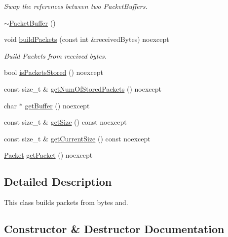 \begin{DoxyCompactItemize}
\begin{DoxyCompactList}\small\item\em Swap the references between two Packet\+Buffers. \end{DoxyCompactList}\item 
\hyperlink{classtnnf_1_1_packet_buffer_a5a962401516828ef393e69d61d5fd3d6}{$\sim$\+Packet\+Buffer} ()
\item 
void \hyperlink{classtnnf_1_1_packet_buffer_adcdb6c55ea7dacf133d6023ac22c1210}{build\+Packets} (const int \&received\+Bytes) noexcept
\begin{DoxyCompactList}\small\item\em Build Packets from received bytes. \end{DoxyCompactList}\item 
bool \hyperlink{classtnnf_1_1_packet_buffer_af43633c6f4756697a7fafe3bd85d5663}{is\+Packets\+Stored} () noexcept
\item 
const size\+\_\+t \& \hyperlink{classtnnf_1_1_packet_buffer_abdbab0715e0c034cd64217ca89b3038b}{get\+Num\+Of\+Stored\+Packets} () noexcept
\item 
char $\ast$ \hyperlink{classtnnf_1_1_packet_buffer_a19e723b7d1956ae5d0bc82399c08d754}{get\+Buffer} () noexcept
\item 
const size\+\_\+t \& \hyperlink{classtnnf_1_1_packet_buffer_a7372d2a4bbaf72994f151e2c71340d61}{get\+Size} () const noexcept
\item 
const size\+\_\+t \& \hyperlink{classtnnf_1_1_packet_buffer_a26ce7667e35c0f09c6dd989cfca107ab}{get\+Current\+Size} () const noexcept
\item 
\hyperlink{classtnnf_1_1_packet}{Packet} \hyperlink{classtnnf_1_1_packet_buffer_a60a8858e349105d35f983c2fa2516a36}{get\+Packet} () noexcept
\end{DoxyCompactItemize}


\subsection{Detailed Description}
This class builds packets from bytes and. 

\subsection{Constructor \& Destructor Documentation}
\hypertarget{classtnnf_1_1_packet_buffer_a8ac26d292ab3f11539b2e8302ab65bc3}{}
